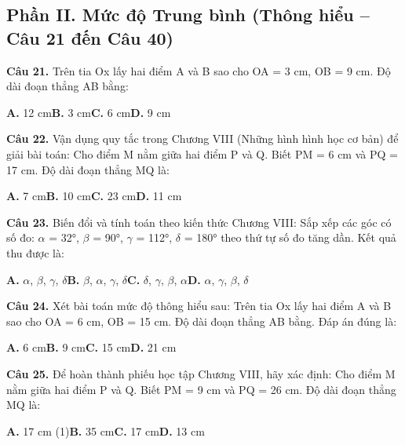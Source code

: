 \documentclass[11pt,a4paper]{article}
\begin{document}
\subsection*{\color{accent} Phần II. Mức độ Trung bình (Thông hiểu -- Câu 21 đến Câu 40)}
\textbf{\color{primary} Câu 21.} Trên tia Ox lấy hai điểm A và B sao cho OA = 3 cm, OB = 9 cm. Độ dài đoạn thẳng AB bằng:\par
\hspace*{1.5em}\textbf{A.} 12 cm\quad\quad \textbf{B.} 3 cm\quad\quad \textbf{C.} 6 cm\quad\quad \textbf{D.} 9 cm\par\vspace{2pt}
\textbf{\color{primary} Câu 22.} Vận dụng quy tắc trong Chương VIII (Những hình hình học cơ bản) để giải bài toán: Cho điểm M nằm giữa hai điểm P và Q. Biết PM = 6 cm và PQ = 17 cm. Độ dài đoạn thẳng MQ là:\par
\hspace*{1.5em}\textbf{A.} 7 cm\quad\quad \textbf{B.} 10 cm\quad\quad \textbf{C.} 23 cm\quad\quad \textbf{D.} 11 cm\par\vspace{2pt}
\textbf{\color{primary} Câu 23.} Biến đổi và tính toán theo kiến thức Chương VIII: Sắp xếp các góc có số đo: $\alpha$ = 32°, $\beta$ = 90°, $\gamma$ = 112°, $\delta$ = 180° theo thứ tự số đo tăng dần. Kết quả thu được là:\par
\hspace*{1.5em}\textbf{A.} $\alpha$, $\beta$, $\gamma$, $\delta$\quad\quad \textbf{B.} $\beta$, $\alpha$, $\gamma$, $\delta$\quad\quad \textbf{C.} $\delta$, $\gamma$, $\beta$, $\alpha$\quad\quad \textbf{D.} $\alpha$, $\gamma$, $\beta$, $\delta$\par\vspace{2pt}
\textbf{\color{primary} Câu 24.} Xét bài toán mức độ thông hiểu sau: Trên tia Ox lấy hai điểm A và B sao cho OA = 6 cm, OB = 15 cm. Độ dài đoạn thẳng AB bằng. Đáp án đúng là:\par
\hspace*{1.5em}\textbf{A.} 6 cm\quad\quad \textbf{B.} 9 cm\quad\quad \textbf{C.} 15 cm\quad\quad \textbf{D.} 21 cm\par\vspace{2pt}
\textbf{\color{primary} Câu 25.} Để hoàn thành phiếu học tập Chương VIII, hãy xác định: Cho điểm M nằm giữa hai điểm P và Q. Biết PM = 9 cm và PQ = 26 cm. Độ dài đoạn thẳng MQ là:\par
\hspace*{1.5em}\textbf{A.} 17 cm (1)\quad\quad \textbf{B.} 35 cm\quad\quad \textbf{C.} 17 cm\quad\quad \textbf{D.} 13 cm\par\vspace{2pt}
\end{document}
